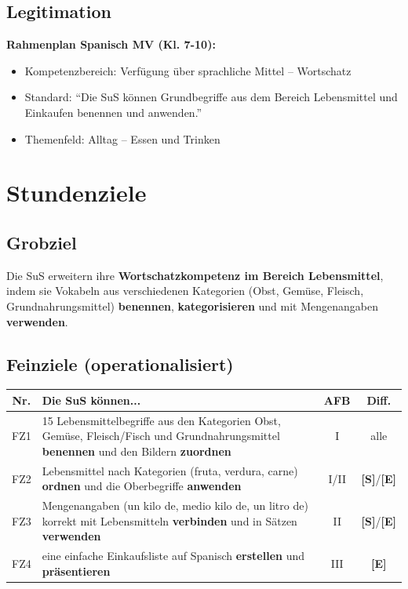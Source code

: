 \documentclass[11pt,a4paper]{article}
\newcommand{\Std}{\textcolor{standard}{\textbf{[S]}}}
\newcommand{\E}{\textcolor{erweiterung}{\textbf{[E]}}}
\begin{document}
\subsection{Legitimation}
\textbf{Rahmenplan Spanisch MV (Kl. 7-10):}
\begin{itemize}
    \item Kompetenzbereich: Verfügung über sprachliche Mittel -- Wortschatz
    \item Standard: ``Die SuS können Grundbegriffe aus dem Bereich Lebensmittel und Einkaufen benennen und anwenden.''
    \item Themenfeld: Alltag -- Essen und Trinken
\end{itemize}

\section{Stundenziele}

\subsection{Grobziel}
Die SuS erweitern ihre \textbf{Wortschatzkompetenz im Bereich Lebensmittel}, indem sie Vokabeln aus verschiedenen Kategorien (Obst, Gemüse, Fleisch, Grundnahrungsmittel) \textbf{benennen}, \textbf{kategorisieren} und mit Mengenangaben \textbf{verwenden}.

\subsection{Feinziele (operationalisiert)}
\begin{tabular}{|c|p{7.5cm}|c|c|}
\hline
\textbf{Nr.} & \textbf{Die SuS können...} & \textbf{AFB} & \textbf{Diff.} \\
\hline
FZ1 & 15 Lebensmittelbegriffe aus den Kategorien Obst, Gemüse, Fleisch/Fisch und Grundnahrungsmittel \textbf{benennen} und den Bildern \textbf{zuordnen} & I & alle \\
\hline
FZ2 & Lebensmittel nach Kategorien (fruta, verdura, carne) \textbf{ordnen} und die Oberbegriffe \textbf{anwenden} & I/II & \Std{}/\E{} \\
\hline
FZ3 & Mengenangaben (un kilo de, medio kilo de, un litro de) korrekt mit Lebensmitteln \textbf{verbinden} und in Sätzen \textbf{verwenden} & II & \Std{}/\E{} \\
\hline
FZ4 & eine einfache Einkaufsliste auf Spanisch \textbf{erstellen} und \textbf{präsentieren} & III & \E{} \\
\hline
\end{tabular}
\end{document}
